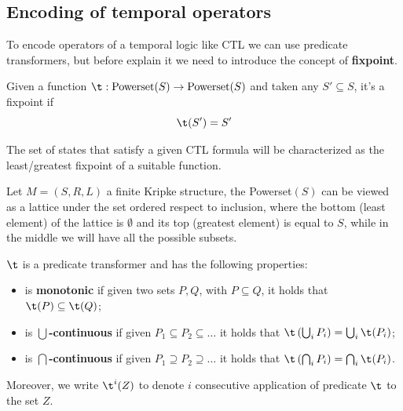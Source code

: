 \documentclass[oneside]{academica}
\begin{document}
\subsection{Encoding of temporal operators}

To encode operators of a temporal logic like CTL we can use predicate transformers, but before explain it we need to introduce the concept of \textbf{fixpoint}.
\begin{definition*}[Fixpoint]
  Given a function $\t: \text{Powerset}(S) \to \text{Powerset}(S)$ and taken any $S' \subseteq S$, it's a fixpoint if
  \begin{equation*}
    \t(S') = S'
  \end{equation*}
\end{definition*}
The set of states that satisfy a given CTL formula will be characterized as the least/greatest fixpoint of a suitable function.

Let $M = (S,R,L)$ a finite Kripke structure, the Powerset$(S)$ can be viewed as a lattice under the set ordered respect to inclusion, where the bottom (least element) of the lattice is $\emptyset$ and its top (greatest element) is equal to $S$, while in the middle we will have all the possible subsets.

$\t$ is a predicate transformer and has the following properties:
\begin{itemize}
  \item is \textbf{monotonic} if given two sets $P,Q$, with $P \subseteq Q$, it holds that $\t(P) \subseteq \t(Q)$;
  \item is \textbf{$\bigcup$-continuous} if given $P_1 \subseteq P_2 \subseteq \dots$ it holds that $\t\left(\bigcup_i P_i\right) = \bigcup_i \t(P_i)$;
  \item is \textbf{$\bigcap$-continuous} if given $P_1 \supseteq P_2 \supseteq \dots$ it holds that $\t\left(\bigcap_i P_i\right) = \bigcap_i \t(P_i)$.
\end{itemize}
Moreover, we write $\t^i(Z)$ to denote $i$ consecutive application of predicate $\t$ to the set $Z$.
\end{document}
